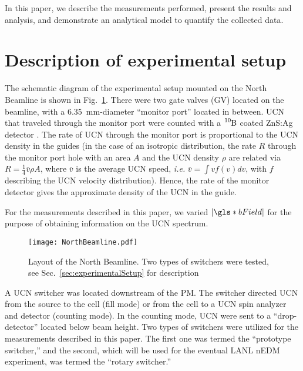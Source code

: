In this paper, we describe the measurements performed, present the results and analysis, and demonstrate an analytical model to quantify the collected data. 


\section{\label{sec:experimentalSetup}Description of experimental setup}


The schematic diagram of the experimental setup mounted on the North Beamline is shown in Fig.~\ref{fig:NorthBeamlineLayout}. There were two gate valves (GV) located on the beamline, with a \qty{6.35}{\mm}-diameter ``monitor port'' located in between. UCN that traveled through the monitor port were counted with a $\ce{^{10}B}$ coated ZnS:Ag detector \cite{jeph_b10_2011}. The rate of UCN through the monitor port is proportional to the UCN density in the guides (in the case of an isotropic distribution, the rate $R$ through the monitor port hole with an area $A$ and the UCN density $\rho$ are related via  $R = \frac{1}{4} \bar{v} \rho A$, where $\bar{v}$ is the average UCN speed, {\it i.e.} $\bar{v} = \int vf(v)dv$, with $f$ describing the UCN velocity distribution). Hence, the rate of the monitor detector gives the approximate density of the UCN in the guide.

 For the measurements described in this paper, we varied $ |\gls*{bField} |$ for the purpose of obtaining information on the UCN spectrum.



\begin{figure}[htp]
    \centering
    \texttt{[image: NorthBeamline.pdf]}
    \caption[Layout of the North Beamline.]{Layout of the North Beamline. Two types of switchers were tested, see Sec.~\ref{sec:experimentalSetup} for description}
    \label{fig:NorthBeamlineLayout}
\end{figure}

A UCN switcher was located downstream of the PM. The switcher directed UCN from the source to the cell (fill mode) or from the cell to a UCN spin analyzer and detector (counting mode). In the counting mode, UCN were sent to a ``drop-detector'' located below beam height. Two types of switchers were utilized for the measurements described in this paper. The first one was termed the ``prototype switcher,'' and the second, which will be used for the eventual LANL nEDM experiment, was termed the ``rotary switcher.'' 

